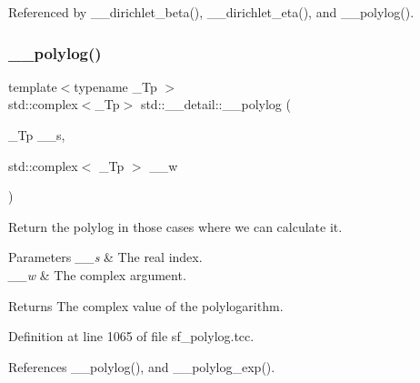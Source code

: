 Referenced by \+\_\+\+\_\+dirichlet\+\_\+beta(), \+\_\+\+\_\+dirichlet\+\_\+eta(), and \+\_\+\+\_\+polylog().

\mbox{\label{namespacestd_1_1____detail_aa14e3ca6e4bee5ac1f1e5e1c2cee1d5a}} 
\subsubsection{\texorpdfstring{\+\_\+\+\_\+polylog()}{\_\_polylog()}\hspace{0.1cm}{\footnotesize\ttfamily [2/2]}}
{\footnotesize\ttfamily template$<$typename \+\_\+\+Tp $>$ \\
std\+::complex$<$\+\_\+\+Tp$>$ std\+::\+\_\+\+\_\+detail\+::\+\_\+\+\_\+polylog (\begin{DoxyParamCaption}\item[{\+\_\+\+Tp}]{\+\_\+\+\_\+s,  }\item[{std\+::complex$<$ \+\_\+\+Tp $>$}]{\+\_\+\+\_\+w }\end{DoxyParamCaption})}

Return the polylog in those cases where we can calculate it.


\begin{DoxyParams}{Parameters}
{\em \+\_\+\+\_\+s} & The real index. \\
\hline
{\em \+\_\+\+\_\+w} & The complex argument. \\
\hline
\end{DoxyParams}
\begin{DoxyReturn}{Returns}
The complex value of the polylogarithm. 
\end{DoxyReturn}


Definition at line 1065 of file sf\+\_\+polylog.\+tcc.



References \+\_\+\+\_\+polylog(), and \+\_\+\+\_\+polylog\+\_\+exp().

\mbox{\label{namespacestd_1_1____detail_a0f6f2fc92d4ccec43975a6b9aca9851a}} 
